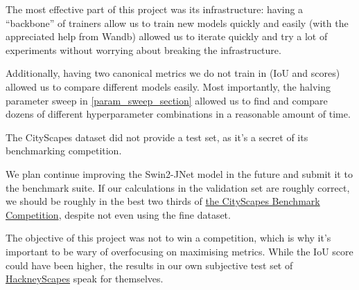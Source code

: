 The most effective part of this project was its infrastructure: having a ``backbone'' of trainers allow us to train new models quickly and easily (with the appreciated help from Wandb) allowed us to iterate quickly and try a lot of experiments without worrying about breaking the infrastructure.

Additionally, having two canonical metrics we do not train in (IoU and \iiouc{} scores) allowed us to compare different models easily.
Most importantly, the halving parameter sweep in \cref{param_sweep_section} allowed us to find and compare dozens of different hyperparameter combinations in a reasonable amount of time.

The CityScapes dataset did not provide a test set, as it's a secret of its benchmarking competition\cite{cityscapes_benchmark}.

We plan continue improving the Swin2-JNet model in the future and submit it to the benchmark suite.
If our calculations in the validation set are roughly correct, we should be roughly in the best two thirds of \href{https://www.cityscapes-dataset.com/benchmarks/#pixel-level-results}{the CityScapes Benchmark Competition}, despite not even using the fine dataset.

The objective of this project was not to win a competition, which is why it's important to be wary of overfocusing on maximising metrics.
While the IoU score could have been higher, the results in our own subjective test set of \hyperref[hackneyscapes]{HackneyScapes} speak for themselves.
